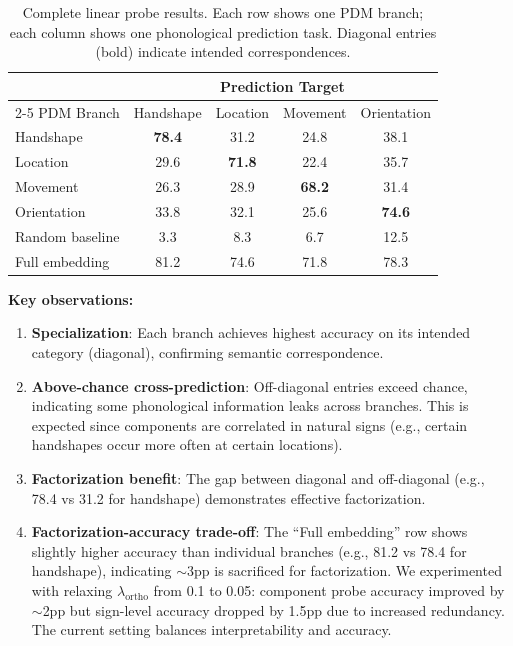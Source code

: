 \documentclass[sigconf,nonacm,anonymous]{acmart}
\theoremstyle{definition}
\theoremstyle{remark}
\begin{document}
\begin{table}[ht]
\caption{Complete linear probe results. Each row shows one PDM branch; each column shows one phonological prediction task. Diagonal entries (bold) indicate intended correspondences.}
\label{tab:full_probe}
\begin{center}
\small
\begin{tabular}{lcccc}
\toprule
& \multicolumn{4}{c}{Prediction Target} \\
\cmidrule(lr){2-5}
PDM Branch & Handshape & Location & Movement & Orientation \\
\midrule
Handshape & \textbf{78.4} & 31.2 & 24.8 & 38.1 \\
Location & 29.6 & \textbf{71.8} & 22.4 & 35.7 \\
Movement & 26.3 & 28.9 & \textbf{68.2} & 31.4 \\
Orientation & 33.8 & 32.1 & 25.6 & \textbf{74.6} \\
\midrule
Random baseline & 3.3 & 8.3 & 6.7 & 12.5 \\
Full embedding & 81.2 & 74.6 & 71.8 & 78.3 \\
\bottomrule
\end{tabular}
\end{center}
\end{table}

\textbf{Key observations:}
\begin{enumerate}[nosep,topsep=2pt]
\item \textbf{Specialization}: Each branch achieves highest accuracy on its intended category (diagonal), confirming semantic correspondence.
\item \textbf{Above-chance cross-prediction}: Off-diagonal entries exceed chance, indicating some phonological information leaks across branches. This is expected since components are correlated in natural signs (e.g., certain handshapes occur more often at certain locations).
\item \textbf{Factorization benefit}: The gap between diagonal and off-diagonal (e.g., 78.4 vs 31.2 for handshape) demonstrates effective factorization.
\item \textbf{Factorization-accuracy trade-off}: The ``Full embedding'' row shows slightly higher accuracy than individual branches (e.g., 81.2 vs 78.4 for handshape), indicating $\sim$3pp is sacrificed for factorization. We experimented with relaxing $\lambda_{\text{ortho}}$ from 0.1 to 0.05: component probe accuracy improved by $\sim$2pp but sign-level accuracy dropped by 1.5pp due to increased redundancy. The current setting balances interpretability and accuracy.
\end{enumerate}
\end{document}
